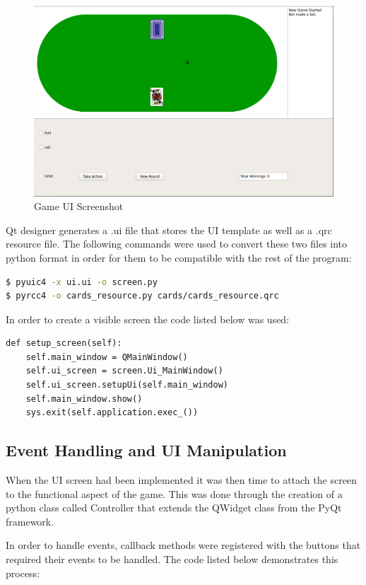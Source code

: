 \begin{figure}[ht]
    \includegraphics[scale=.4]{images/UI_screenshot.png}
    \caption{Game UI Screenshot}
\end{figure}

Qt designer generates a .ui file that stores the UI template as well as a .qrc resource file.
The following commands were used to convert these two files into python format in order for them
to be compatible with the rest of the program:
\begin{lstlisting}[language=bash]
$ pyuic4 -x ui.ui -o screen.py
$ pyrcc4 -o cards_resource.py cards/cards_resource.qrc
\end{lstlisting}

In order to create a visible screen the code listed below was used:
\begin{lstlisting}[style=Python]
def setup_screen(self):
    self.main_window = QMainWindow()
    self.ui_screen = screen.Ui_MainWindow()
    self.ui_screen.setupUi(self.main_window)
    self.main_window.show()
    sys.exit(self.application.exec_())
\end{lstlisting}

\subsection{Event Handling and UI Manipulation}\label{subsec:eventHandling}
When the UI screen had been implemented it was then time to attach the screen to the
functional aspect of the game.
This was done through the creation of a python class called Controller that extends the QWidget
class from the PyQt framework.

In order to handle events, callback methods were registered with the buttons that required their events to be handled.
The code listed below demonstrates this process:

